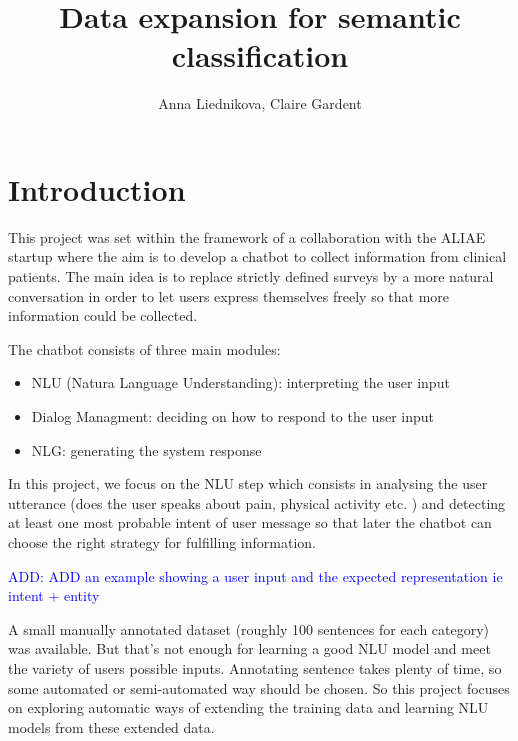 \documentclass[11pt]{article}
\begin{document}
\newcommand\add[1]{{\textcolor{blue}{ADD: #1}}}
\newcommand\modi[1]{{\textcolor{green}{MODIFIED: #1}}}
\newcommand\remove[1]{{\textcolor{red}{REMOVE: #1}}}
\newcommand\expand[1]{{\textcolor{blue}{EXPAND: #1}}}
\newcommand\rewrite[1]{{\textcolor{green}{REWRITE: #1}}}



\title{Data expansion for semantic classification}

\author{Anna Liednikova, Claire Gardent}




\maketitle

\tableofcontents

\clearpage

\section{Introduction}

 
This project was set within the framework of a collaboration with the
ALIAE startup where the aim is to develop a chatbot to collect
information from clinical patients. The main idea is to replace
strictly defined surveys by a more natural conversation in order to
let users express themselves freely so that more information could be
collected.

The chatbot consists of three main modules: 
\begin{itemize}
\item NLU (Natura Language Understanding): interpreting the user input
\item Dialog Managment: deciding on how to respond to the user input
\item NLG: generating the system response
\end{itemize}

In this project, we focus on the NLU step which consists in
analysing the user utterance (does the user speaks about pain,
physical activity etc. ) and detecting at least one most probable
intent of user message so that later the chatbot can choose the right
strategy for fulfilling information.

\add{ADD an example showing a user input and the expected representation ie intent + entity}

A small manually annotated dataset (roughly 100 sentences for each category) was available. But that's not enough for learning a good NLU model and meet the variety of users possible inputs. Annotating sentence takes plenty of time, so some automated or semi-automated way should be chosen. So this project focuses on exploring automatic ways of extending the training data and learning NLU models from these extended data.
\end{document}
